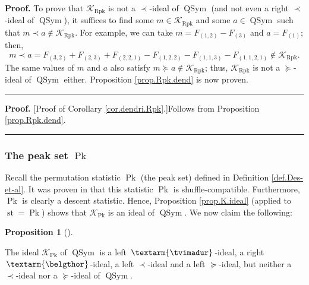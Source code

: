 \documentclass[numbers=enddot,12pt,final,onecolumn,notitlepage]{scrartcl}%
\theoremstyle{definition}
\newtheorem{prop}[theo]{Proposition}
\newenvironment{proposition}[1][]
{\begin{prop}[#1]\begin{leftbar}}
{\end{leftbar}\end{prop}}
\newenvironment{proof}[1][Proof]{\noindent\textbf{#1.} }{\ \rule{0.5em}{0.5em}}
\newenvironment{verlong}{}{}
\newcommand{\tvi}{\left. \textarm{\tvimadur} \right.}
\newcommand{\bel}{\left. \textarm{\belgthor} \right.}
\begin{document}
\begin{verlong}
\begin{proof}
To prove that $\mathcal{K}_{\operatorname*{Rpk}}$ is not a $\left.
\prec\right.  $-ideal of $\operatorname*{QSym}$ (and not even a right $\left.
\prec\right.  $-ideal of $\operatorname*{QSym}$), it suffices to find some
$m\in\mathcal{K}_{\operatorname*{Rpk}}$ and some $a\in\operatorname*{QSym}$
such that $m\left.  \prec\right.  a\notin\mathcal{K}_{\operatorname*{Rpk}}$.
For example, we can take $m=F_{\left(  1,2\right)  }-F_{\left(  3\right)  }$
and $a=F_{\left(  1\right)  }$; then,
\[
m\left.  \prec\right.  a=F_{\left(  3,2\right)  }+F_{\left(  2,3\right)
}+F_{\left(  2,2,1\right)  }-F_{\left(  1,2,2\right)  }-F_{\left(
1,1,3\right)  }-F_{\left(  1,1,2,1\right)  }\notin\mathcal{K}%
_{\operatorname*{Rpk}}.
\]
The same values of $m$ and $a$ also satisfy $m\left.  \succeq\right.
a\notin\mathcal{K}_{\operatorname*{Rpk}}$; thus, $\mathcal{K}%
_{\operatorname*{Rpk}}$ is not a $\left.  \succeq\right.  $-ideal of
$\operatorname*{QSym}$ either. Proposition \ref{prop.Rpk.dend} is now proven.
\end{proof}

\begin{proof}
[Proof of Corollary \ref{cor.dendri.Rpk}.]Follows from Proposition
\ref{prop.Rpk.dend}.
\end{proof}

\subsubsection{The peak set $\operatorname*{Pk}$}

Recall the permutation statistic $\operatorname*{Pk}$ (the peak set) defined
in Definition \ref{def.Des-et-al}. It was proven in \cite[Theorem 4.7
\textbf{(a)}]{part1} that this statistic $\operatorname*{Pk}$ is
shuffle-compatible. Furthermore, $\operatorname*{Pk}$ is clearly a descent
statistic. Hence, Proposition \ref{prop.K.ideal} (applied to
$\operatorname*{st}=\operatorname*{Pk}$) shows that $\mathcal{K}%
_{\operatorname*{Pk}}$ is an ideal of $\operatorname*{QSym}$. We now claim the following:

\begin{proposition}
\label{prop.Pk.dend}The ideal $\mathcal{K}_{\operatorname*{Pk}}$ of
$\operatorname*{QSym}$ is a left $\tvi$-ideal, a right $\bel$-ideal, a left
$\left.  \prec\right.  $-ideal and a left $\left.  \succeq\right.  $-ideal,
but neither a $\left.  \prec\right.  $-ideal nor a $\left.  \succeq\right.
$-ideal of $\operatorname*{QSym}$.
\end{proposition}


\end{verlong}
\end{document}
